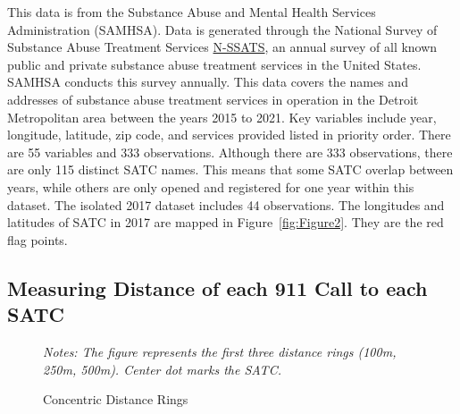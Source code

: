 \documentclass[12pt]{article}
\begin{document}
This data is from the Substance Abuse and Mental Health Services Administration (SAMHSA). Data is generated through the National Survey of Substance Abuse Treatment Services \href{https://www.samhsa.gov/data/data-we-collect/n-ssats-national-survey-substance-abuse-treatment-services}{N-SSATS}, an annual survey of all known public and private substance abuse treatment services in the United States. SAMHSA conducts this survey annually.  This data covers the names and addresses of substance abuse treatment services in operation in the Detroit Metropolitan area between the years 2015 to 2021. Key variables include year, longitude, latitude, zip code, and services provided listed in priority order. There are 55 variables and 333 observations.\footnotemark[1] Although there are 333 observations, there are only 115 distinct SATC names. This means that some SATC overlap between years, while others are only opened and registered for one year within this dataset. The isolated 2017 dataset includes 44 observations. The longitudes and latitudes of SATC in 2017 are mapped in Figure~\ref{fig:Figure2}. They are the red flag points. 


\subsection{Measuring Distance of each 911 Call to each SATC}
 


\begin{figure} 
\caption{Concentric Distance Rings}
\label{fig:Figure1}
\small\textit{Notes: The figure represents the first three distance rings (100m, 250m, 500m). Center dot marks the SATC.}
\end{figure}
\end{document}
